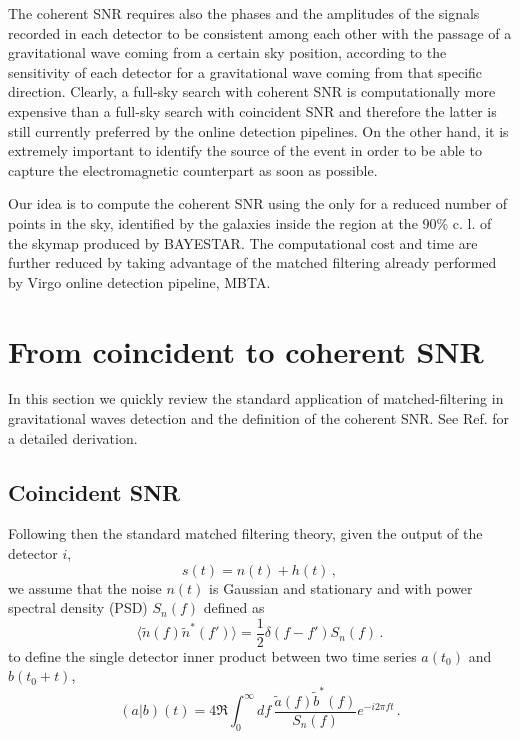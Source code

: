 \documentclass[aps, prd, twocolumn, superscriptaddress, nofootinbib]{revtex4-1}
\begin{document}
The coherent SNR requires also the phases and the amplitudes of the signals recorded in each detector to be consistent among each other with the passage of a gravitational wave coming from a certain sky position, according to the sensitivity of each detector for a gravitational wave coming from that specific direction.
 Clearly, a full-sky search with coherent SNR is computationally more expensive than a full-sky search with coincident SNR and therefore the latter is still currently preferred by the online detection pipelines.
On the other hand, it is extremely  important to identify the source of the event in order to be able to capture the electromagnetic counterpart as soon as possible.

Our idea is to compute the coherent SNR using the  only for a reduced number of points in the sky, identified by the galaxies inside the region at the 90\% c. l. of the skymap produced by BAYESTAR. The computational cost and time are further reduced by taking advantage of the matched filtering already performed by Virgo online detection pipeline, MBTA.

\section{From coincident  to coherent SNR}
In this section we quickly review the standard application of matched-filtering in gravitational waves detection and the definition of the coherent SNR. See Ref.\cite{cohSNR} for a detailed derivation.

\subsection{Coincident SNR}
Following then the standard matched filtering theory, given the  output of the detector $i$,
\begin{equation}
s(t)=n(t)+h(t)\, ,
\end{equation}
we assume that the noise $n(t)$ is Gaussian and stationary and with power spectral density (PSD) $S_n(f)$ defined as
\begin{equation}
\langle \tilde{n}(f)\tilde{n}^{*}(f')\rangle=\frac{1}{2}\delta(f-f')S_n(f)\, .
\end{equation}
to define the single detector inner product between two time series $a(t_0)$ and $b(t_0+t)$,
\begin{equation}
(a|b)(t)=4 \Re\int_0^\infty df\, \frac{\tilde{a}(f)\tilde{b}^*(f)}{S_n(f)}e^{-i2\pi ft}\, .
\end{equation}
\end{document}
